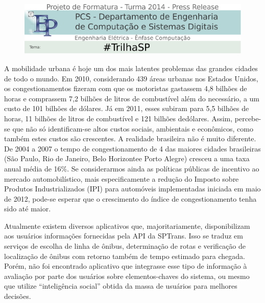 \documentclass[a4paper,oneside,12pt,english,brazil]{article}
\begin{document}
%
\begin{figure}[Htb]
\includegraphics[width=\textwidth]{header.eps}
\end{figure}
A mobilidade urbana é hoje um dos mais latentes problemas das grandes cidades de todo o mundo. Em 2010, considerando 439 áreas urbanas nos Estados Unidos, os congestionamentos fizeram com que os motoristas gastassem 4,8 bilhões de horas e comprassem 7,2 bilhões de litros de combustível além do necessário, a um custo de 101 bilhões de dólares. Já em 2011, esses subiram para 5,5 bilhões de horas, 11 bilhões de litros de combustível e 121 bilhões dedólares. Assim, percebe-se que não só identificam-se altos custos sociais, ambientais e econômicos, como também estes custos são crescentes. A realidade brasileira não é muito diferente. De 2004 a 2007 o tempo de congestionamento de 4 das maiores cidades brasileiras (São Paulo, Rio de Janeiro, Belo Horizontee Porto Alegre) cresceu a uma taxa anual média de 16\%. Se considerarmos ainda as políticas públicas de incentivo ao mercado automobilístico, mais especificamente a redução do Imposto sobre Produtos Industrializados (IPI) para automóveis implementadas iniciada em maio de 2012, pode-se esperar que o crescimento do índice de congestionamento tenha sido até maior.

Atualmente existem diversos aplicativos que, majoritariamente, disponibilizam  aos usuários informações fornecidas pela API da  SPTrans. Isso se traduz em serviços de escolha de linha de ônibus, determinação de rotas e verificação de localização de ônibus com retorno também de tempo estimado para chegada.
Porém, não foi encontrado aplicativo que integrasse esse tipo de informação à avaliação por parte dos usuários sobre elementos-chaves do sistema, ou mesmo que utilize ``inteligência social'' obtida da massa de usuários para melhores decisões.
\end{document}
